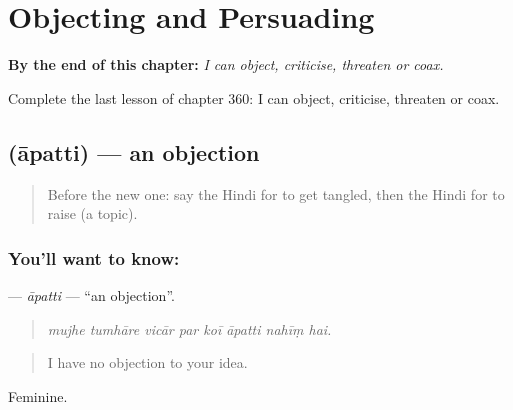 
\chapter{Objecting and Persuading}
\label{ch:hi-objecting-and-persuading}

\begin{chapteropening}
\textbf{By the end of this chapter:} \emph{I can object, criticise, threaten or coax.}

Complete the last lesson of chapter 360: I can object, criticise, threaten or coax.
\end{chapteropening}

\section[\texorpdfstring{\hi{आपत्ति} (āpatti)}{आपत्ति (āpatti)}]{ (āpatti) — an objection}

\label{lesson:HI-C360-apatti}



\begin{quote}
Before the new one: say the Hindi for to get tangled, then the Hindi for to raise (a topic).
\end{quote}

\subsection*{You'll want to know: }
\textbf{} — \emph{āpatti} — \textquotedblleft{}an objection\textquotedblright{}.

\begin{quote}
       
\end{quote}

\begin{quote}
\emph{mujhe tumhāre vicār par koī āpatti nahīṃ hai.}
\end{quote}

\begin{quote}
I have no objection to your idea.
\end{quote}

Feminine.

